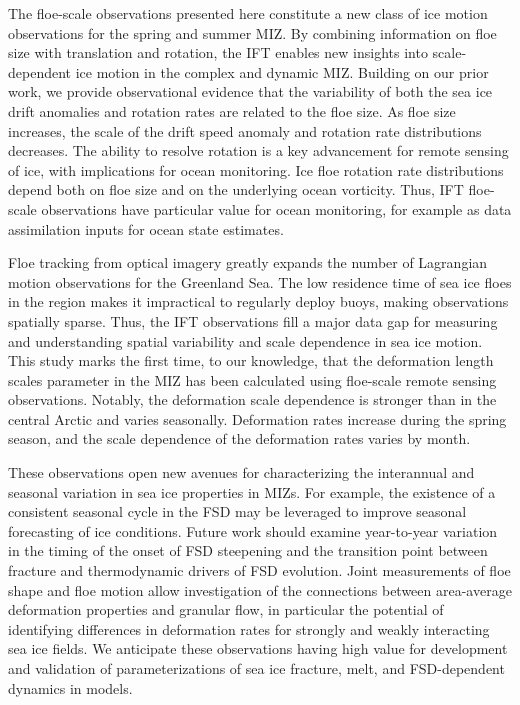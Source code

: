 \documentclass[review, jog]{igs}
\begin{document}
The floe-scale observations presented here constitute a new class of ice motion observations for the spring and summer MIZ. By combining information on floe size with translation and rotation, the IFT enables new insights into scale-dependent ice motion in the complex and dynamic MIZ.
Building on our prior work, we provide observational evidence that the variability of both the sea ice drift anomalies and rotation rates are related to the floe size. As floe size increases, the scale of the drift speed anomaly and rotation rate distributions decreases.
The ability to resolve rotation is a key advancement for remote sensing of ice, with implications for ocean monitoring.
Ice floe rotation rate distributions depend both on floe size and on the underlying ocean vorticity.
Thus, IFT floe-scale observations have particular value for ocean monitoring, for example as data assimilation inputs for ocean state estimates.

Floe tracking from optical imagery greatly expands the number of Lagrangian motion observations for the Greenland Sea.
The low residence time of sea ice floes in the region makes it impractical to regularly deploy buoys, making observations spatially sparse.
Thus, the IFT observations fill a major data gap for measuring and understanding spatial variability and scale dependence in sea ice motion.
This study marks the first time, to our knowledge, that the deformation length scales parameter in the MIZ has been calculated using floe-scale remote sensing observations.
Notably, the deformation scale dependence is stronger than in the central Arctic and varies seasonally.
Deformation rates increase during the spring season, and the scale dependence of the deformation rates varies by month.

These observations open new avenues for characterizing the interannual and seasonal variation in sea ice properties in MIZs.
For example, the existence of a consistent seasonal cycle in the FSD may be leveraged to improve seasonal forecasting of ice conditions.
Future work should examine year-to-year variation in the timing of the onset of FSD steepening and the transition point between fracture and thermodynamic drivers of FSD evolution.
Joint measurements of floe shape and floe motion allow investigation of the connections between area-average deformation properties and granular flow, in particular the potential of identifying differences in deformation rates for strongly and weakly interacting sea ice fields.
We anticipate these observations having high value for development and validation of parameterizations of sea ice fracture, melt, and FSD-dependent dynamics in models.
\end{document}
